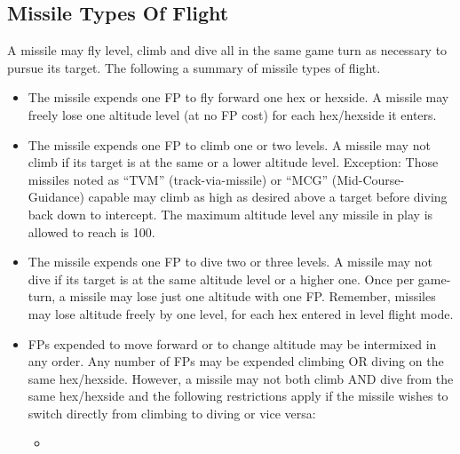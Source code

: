 \subsection{Missile Types Of Flight} A missile may fly level, climb and dive all in the same game turn as necessary to pursue its target. The following  a summary of missile types of flight.


\begin{itemize}

    \item {} The missile expends one FP to fly forward one hex or hexside. A missile may freely lose one altitude level (at no FP cost) for each hex/hexside it enters.

    \item {} The missile expends one FP to climb one or two levels. A missile may not climb if its target is at the same or a lower altitude level. Exception: Those missiles noted as “TVM” (track-via-missile) or “MCG” (Mid-Course-Guidance) capable may climb as high as desired above a target before diving back down to intercept. The maximum altitude level any missile in play is allowed to reach is 100.

    \item {} The missile expends one FP to dive two or three levels. A missile may not dive if its target is at the same altitude level or a higher one. Once per game-turn, a missile may lose just one altitude with one FP. Remember, missiles may lose altitude freely by one level, for each hex entered in level flight mode.

    \item {} FPs expended to move forward or to change altitude may be intermixed in any order. Any number of FPs may be expended climbing OR diving on the same hex/hexside. However, a missile may not both climb AND dive from the same hex/hexside and the following restrictions apply if the missile wishes to switch directly from climbing to diving or vice versa:

        \begin{itemize}

            \item {}


\end{itemize}
\end{itemize}
